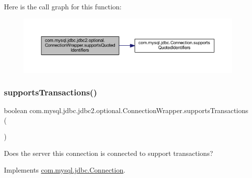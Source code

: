 Here is the call graph for this function\+:
\nopagebreak
\begin{figure}[H]
\begin{center}
\leavevmode
\includegraphics[width=350pt]{classcom_1_1mysql_1_1jdbc_1_1jdbc2_1_1optional_1_1_connection_wrapper_aee329f3049dfe677c6baa7454004bd2a_cgraph}
\end{center}
\end{figure}
\mbox{\label{classcom_1_1mysql_1_1jdbc_1_1jdbc2_1_1optional_1_1_connection_wrapper_a1f15bbe2ddf9ab93df95fd71932a0908}} 
\subsubsection{\texorpdfstring{supports\+Transactions()}{supportsTransactions()}}
{\footnotesize\ttfamily boolean com.\+mysql.\+jdbc.\+jdbc2.\+optional.\+Connection\+Wrapper.\+supports\+Transactions (\begin{DoxyParamCaption}{ }\end{DoxyParamCaption})}

Does the server this connection is connected to support transactions? 

Implements \mbox{\hyperlink{interfacecom_1_1mysql_1_1jdbc_1_1_connection_a730de8090ab7cf2acfbcb2fefbd84ea2}{com.\+mysql.\+jdbc.\+Connection}}.

